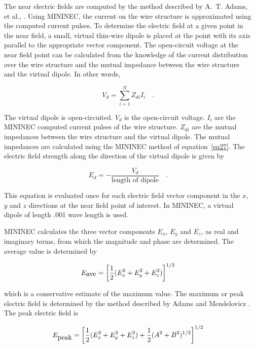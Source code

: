 \documentclass[12pt]{article}
\begin{document}
The near electric fields are computed by the method described by
A.~T. Adams, et al., \cite{r12}. Using MININEC, the current
on the wire structure is approximated using the computed current pulses.
To determine the electric field at a given point in the near field, a
small, virtual thin-wire dipole is placed at the point with its axis
parallel to the appropriate vector component. The open-circuit voltage
at the near field point can be calculated from the knowledge of the
current distribution over the wire structure and the mutual impedance
between the wire structure and the virtual dipole. In other words,

\begin{equation}
V_d = \sum_{i=1}^{N}Z_{di}I_i \quad.
\label{eq32}
\end{equation}

The virtual dipole is open-circuited. $V_d$ is the open-circuit voltage.
$I_i$ are the MININEC computed current pulses of the wire structure.
$Z_{di}$ are the mutual impedances between the wire structure and the
virtual dipole. The mutual impedances are calculated using the MININEC
method of equation~\eqref{eq27}. The electric field strength along the
direction of the virtual dipole is given by

\begin{equation}
E_d = -\frac{V_d}{\mbox{length of dipole}}\quad.
\label{eq33}
\end{equation}

This equation is evaluated once for each electric field vector component
in the $x$, $y$ and $z$ directions at the near field point of interest.
In MININEC, a virtual dipole of length .001 wave length is used.

MININEC calculates the three vector components $E_x$, $E_y$ and $E_z$,
as real and imaginary terms, from which the magnitude and phase are
determined. The average value is determined by

\begin{equation}
E_{\mbox{ave}} = \left[\frac{1}{2}(E_x^2+E_y^2+E_z^2)\right]^{1/2}
\label{eq34}
\end{equation}

\noindent which is a conservative estimate of the maximum value. The maximum or
peak electric field is determined by the method described by Adams and
Mendelovicz \cite{r13}. The peak electric field is

\begin{equation}
E_{\mbox{peak}} = \left[\frac{1}{2}(E_x^2+E_y^2+E_z^2)
                +\frac{1}{2}(A^2+B^2)^{1/2} \right]^{1/2}
\label{eq35}
\end{equation}
\end{document}
